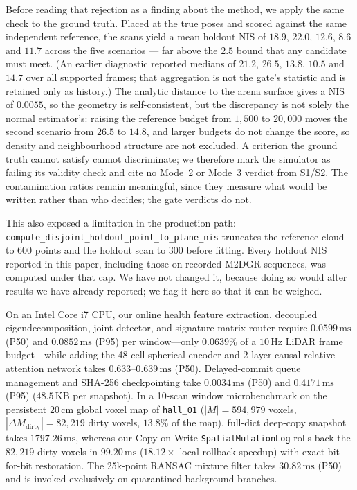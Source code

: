 \documentclass[journal]{IEEEtran}
\begin{document}
Before reading that rejection as a finding about the method, we apply the same check to the ground truth. Placed at the true poses and scored against the same independent reference, the scans yield a mean holdout NIS of $18.9$, $22.0$, $12.6$, $8.6$ and $11.7$ across the five scenarios --- far above the $2.5$ bound that any candidate must meet. (An earlier diagnostic reported medians of $21.2$, $26.5$, $13.8$, $10.5$ and $14.7$ over all supported frames; that aggregation is not the gate's statistic and is retained only as history.) The analytic distance to the arena surface gives a NIS of $0.0055$, so the geometry is self-consistent, but the discrepancy is not solely the normal estimator's: raising the reference budget from $1{,}500$ to $20{,}000$ moves the second scenario from $26.5$ to $14.8$, and larger budgets do not change the score, so density and neighbourhood structure are not excluded. A criterion the ground truth cannot satisfy cannot discriminate; we therefore mark the simulator as failing its validity check and cite no Mode~2 or Mode~3 verdict from S1/S2. The contamination ratios remain meaningful, since they measure what would be written rather than who decides; the gate verdicts do not.

This also exposed a limitation in the production path: \texttt{compute\_disjoint\_holdout\_point\_to\_plane\_nis} truncates the reference cloud to $600$ points and the holdout scan to $300$ before fitting. Every holdout NIS reported in this paper, including those on recorded M2DGR sequences, was computed under that cap. We have not changed it, because doing so would alter results we have already reported; we flag it here so that it can be weighed.

On an Intel Core i7 CPU, our online health feature extraction, decoupled eigendecomposition, joint detector, and signature matrix router require $\mathbf{0.0599\,\mathrm{ms}}$ (P50) and $\mathbf{0.0852\,\mathrm{ms}}$ (P95) per window---only $\mathbf{0.0639\%}$ of a $10\,\mathrm{Hz}$ LiDAR frame budget---while adding the 48-cell spherical encoder and 2-layer causal relative-attention network takes $\mathbf{0.633\text{--}0.639\,\mathrm{ms}}$ (P50). Delayed-commit queue management and SHA-256 checkpointing take $0.0034\,\mathrm{ms}$ (P50) and $0.4171\,\mathrm{ms}$ (P95) ($48.5\,\mathrm{KB}$ per snapshot). In a 10-scan window microbenchmark on the persistent $20\,\mathrm{cm}$ global voxel map of \texttt{hall\_01} ($|M|=594,979$ voxels, $|\Delta M_{\mathrm{dirty}}|=82,219$ dirty voxels, $13.8\%$ of the map), full-dict deep-copy snapshot takes $1797.26\,\mathrm{ms}$, whereas our Copy-on-Write \texttt{SpatialMutationLog} rolls back the $82,219$ dirty voxels in $\mathbf{99.20\,\mathrm{ms}}$ ($\mathbf{18.12\times}$ local rollback speedup) with exact bit-for-bit restoration. The 25k-point RANSAC mixture filter takes $30.82\,\mathrm{ms}$ (P50) and is invoked exclusively on quarantined background branches.
\end{document}
